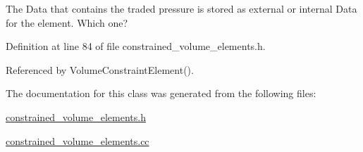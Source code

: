 The Data that contains the traded pressure is stored as external or internal Data for the element. Which one? 



Definition at line 84 of file constrained\+\_\+volume\+\_\+elements.\+h.



Referenced by Volume\+Constraint\+Element().



The documentation for this class was generated from the following files\+:\begin{DoxyCompactItemize}
\item 
\hyperlink{constrained__volume__elements_8h}{constrained\+\_\+volume\+\_\+elements.\+h}\item 
\hyperlink{constrained__volume__elements_8cc}{constrained\+\_\+volume\+\_\+elements.\+cc}\end{DoxyCompactItemize}
